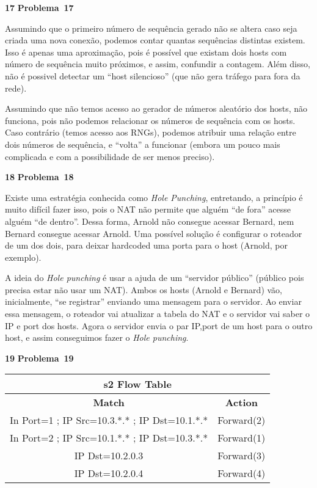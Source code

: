 \documentclass{article}
\newcounter{exe-list}
\newenvironment{exe-list}
    {\begin{list}{\alph{exe-list}.}{\usecounter{exe-list}}}
    {\end{list}}
\newenvironment{exe}[2][Problema]
    {\newcommand{\opt}{(Opcional)}%
    \newcommand{\sketch}[1]{{\bfseries Rascunho:} ##1}%
    \medskip\par\noindent\ifthenelse{\equal{#1}{}}
        {\textbf{\large #2}}
        {\textbf{\large #1~#2}}%
    \medskip\par\noindent}
    {\medskip}
\begin{document}
\begin{exe}{17}
    \begin{exe-list}
    \item
        Assumindo que o primeiro número de sequência gerado
        não se altera caso seja criada uma nova conexão,
        podemos contar quantas sequências distintas existem.
        Isso é apenas uma aproximação, pois
        é possível que
        existam dois hosts com número de sequência muito próximos,
        e assim, confundir a contagem.
        Além disso, não é possivel detectar um ``host silencioso''
        (que não gera tráfego para fora da rede).
    \item
        Assumindo que não temos acesso ao gerador de números aleatório
        dos hosts, não funciona, pois não podemos
        relacionar os números de sequência com os hosts.
        Caso contrário (temos acesso aos RNGs),
        podemos atribuir uma relação entre dois números de sequência,
        e ``volta'' a funcionar (embora um pouco mais complicada
        e com a possibilidade de ser menos preciso).
    \end{exe-list}
\end{exe}

\begin{exe}{18}
    Existe uma estratégia conhecida como \emph{Hole Punching},
    entretando, a princípio é muito difícil fazer isso,
    pois o NAT não permite que alguém ``de fora''
    acesse alguém ``de dentro''.
    Dessa forma, Arnold não consegue acessar Bernard,
    nem Bernard consegue acessar Arnold.
    Uma possível solução é configurar o roteador de um dos dois,
    para deixar hardcoded uma porta para o host (Arnold, por exemplo).

    A ideia do \emph{Hole punching} é
    usar a ajuda de um ``servidor público''
    (público pois precisa estar não usar um NAT).
    Ambos os hosts (Arnold e Bernard) vão, inicialmente,
    ``se registrar'' enviando uma mensagem para o servidor.
    Ao enviar essa mensagem, o roteador vai atualizar
    a tabela do NAT e o servidor vai saber o IP e port dos hosts.
    Agora o servidor envia o par IP,port de um host para o outro host,
    e assim conseguimos fazer o \emph{Hole punching}.
\end{exe}

\begin{exe}{19}
    \begin{center} \begin{tabular}{|c|c|} \hline
        \multicolumn{2}{|c|}{\textbf{s2 Flow Table}} \\\hline
        \textbf{Match} & \textbf{Action} \\\hline
        In Port=1 ; IP Src=10.3.*.* ; IP Dst=10.1.*.*
            & Forward(2) \\\hline
        In Port=2 ; IP Src=10.1.*.* ; IP Dst=10.3.*.*
            & Forward(1) \\\hline
        IP Dst=10.2.0.3
            & Forward(3) \\\hline
        IP Dst=10.2.0.4
            & Forward(4) \\\hline
    \end{tabular} \end{center}
\end{exe}
\end{document}
